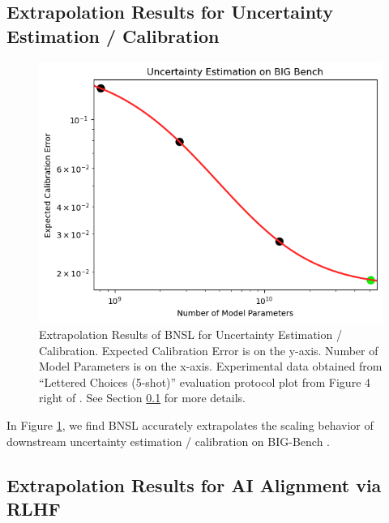 \documentclass{article} %
\begin{document}
\subsection{Extrapolation Results for Uncertainty Estimation / Calibration}
\label{section:uncertainty}

\begin{figure}[htbp]
    \centering
\includegraphics[width=1.0\textwidth]{figures/uncertainty/uncertainty.png}
    \caption{
Extrapolation Results of BNSL for Uncertainty Estimation / Calibration. Expected Calibration Error is on the y-axis. Number of Model Parameters is on the x-axis. Experimental data obtained from ``Lettered Choices (5-shot)'' evaluation protocol plot from Figure 4 right of \cite{kadavath2022language}. See Section \ref{section:uncertainty} for more details.
    }
    \label{fig:uncertainty}
\end{figure}

In Figure \ref{fig:uncertainty}, we find BNSL accurately extrapolates the scaling behavior of downstream uncertainty estimation / calibration on BIG-Bench \citep{srivastava2022beyond}.

\clearpage

\subsection{Extrapolation Results for AI Alignment via RLHF}
\label{section:ai_alignment}
\end{document}

